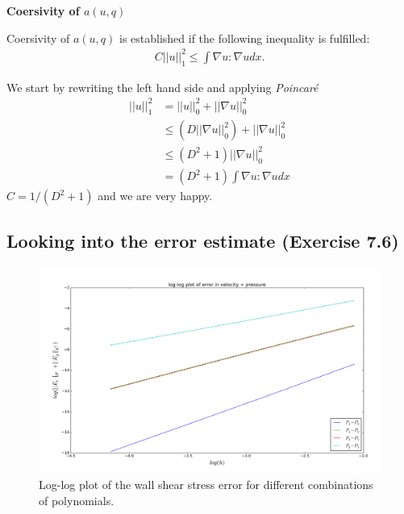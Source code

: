 \documentclass[11pt,a4paper,english]{article}
\numberwithin{equation}{section}
\begin{document}
 
\newpage

\textbf{Coersivity of $a(u,q)$}

Coersivity of $a(u,q)$ is established if the following inequality is fulfilled:
\begin{align*}
C||u||_1^2 \leq \int \nabla u : \nabla u dx. 
\end{align*}

We start by rewriting the left hand side and applying \emph{Poincaré}
\begin{align*}
||u||_1^2 &= ||u||_0^2 + ||\nabla u||_0^2 \\
 &\leq (D||\nabla u||_0^2)+||\nabla u||_0^2 \\
 &\leq (D^2+1)||\nabla u||^2_0 \\
 &=  (D^2+1)\int \nabla u : \nabla u dx
\end{align*}
$C = 1/(D^2+1)$ and we are very happy. 

\newpage

\subsection{Looking into the error estimate (Exercise 7.6)}


\begin{figure}[h!] 
\begin{center}
  \includegraphics[scale=0.25]{stokes_loglog.png}
  \end{center}
  \caption{Log-log plot of the wall shear stress error for different combinations of polynomials.}
   \label{fig:stokes}
\end{figure}
\end{document}

